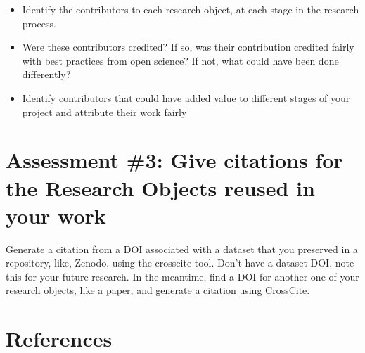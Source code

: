 \documentclass[
  letterpaper,
  DIV=11,
  numbers=noendperiod]{scrreport}
\providecommand{\tightlist}{%
  \setlength{\itemsep}{0pt}\setlength{\parskip}{0pt}}\usepackage{longtable,booktabs,array}
\begin{document}
\begin{itemize}
\tightlist
\item
  Identify the contributors to each research object, at each stage in
  the research process.
\item
  Were these contributors credited? If so, was their contribution
  credited fairly with best practices from open science? If not, what
  could have been done differently?
\item
  Identify contributors that could have added value to different stages
  of your project and attribute their work fairly
\end{itemize}

\hypertarget{assessment-3-give-citations-for-the-research-objects-reused-in-your-work}{%
\section{Assessment \#3: Give citations for the Research Objects reused
in your
work}\label{assessment-3-give-citations-for-the-research-objects-reused-in-your-work}}

Generate a citation from a DOI associated with a dataset that you
preserved in a repository, like, Zenodo, using the crosscite tool. Don't
have a dataset DOI, note this for your future research. In the meantime,
find a DOI for another one of your research objects, like a paper, and
generate a citation using CrossCite.

\hypertarget{references-8}{%
\section{References}\label{references-8}}
\end{document}
